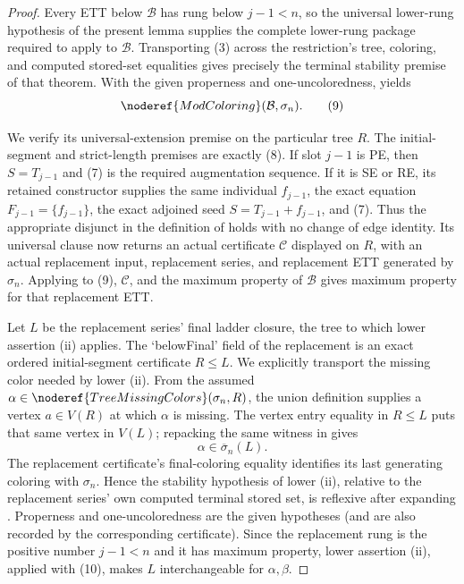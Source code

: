 \begin{proof}
Every ETT below $\mathcal B$ has rung below $j-1<n$, so the universal
lower-rung hypothesis of the present lemma supplies the complete
lower-rung package required to apply  to $\mathcal B$.
Transporting (3) across the restriction's tree, coloring, and computed
stored-set equalities gives precisely the terminal stability premise of
that theorem.  With the given properness and one-uncoloredness,
 yields
\[
                    \noderef{ModColoring}(\mathcal B,\sigma_n). \tag{9}
\]

We verify its universal-extension premise on the particular tree $R$.
The initial-segment and strict-length premises are exactly (8).  If slot
$j-1$ is PE, then $S=T_{j-1}$ and (7) is the required augmentation
sequence.  If it is SE or RE, its retained constructor supplies the same
individual $f_{j-1}$, the exact equation
$F_{j-1}=\{f_{j-1}\}$, the exact adjoined seed $S=T_{j-1}+f_{j-1}$,
and (7).  Thus the appropriate disjunct in the definition of
 holds with no change of edge identity.  Its
universal clause now returns an actual
 certificate $\mathcal C$
displayed on $R$, with an actual replacement input, replacement series,
and replacement ETT generated by $\sigma_n$.  Applying
 to (9), $\mathcal C$, and the maximum
property of $\mathcal B$ gives maximum property for that replacement ETT.

Let $L$ be the replacement series' final ladder closure, the tree to which
lower assertion (ii) applies.  The `belowFinal' field of the replacement
 is an exact ordered initial-segment
certificate $R\leq L$.  We explicitly transport the missing color needed
by lower (ii).  From the assumed
$\alpha\in\noderef{TreeMissingColors}(\sigma_n,R)$, the union definition
supplies a vertex $a\in V(R)$ at which $\alpha$ is missing.  The vertex
entry equality in $R\leq L$ puts that same vertex in $V(L)$; repacking the
same witness in  gives
\[
                   \alpha\in\overline\sigma_n(L).            \tag{10}
\]
The replacement certificate's final-coloring equality identifies its last
generating coloring with $\sigma_n$.  Hence the stability hypothesis of
lower (ii), relative to the replacement series' own computed terminal
stored set, is reflexive after expanding .
Properness and one-uncoloredness are the given hypotheses (and are also
recorded by the corresponding certificate).  Since the replacement rung
is the positive number $j-1<n$ and it has maximum property, lower
assertion (ii), applied with (10), makes $L$ interchangeable for
$\alpha,\beta$.


\end{proof}
